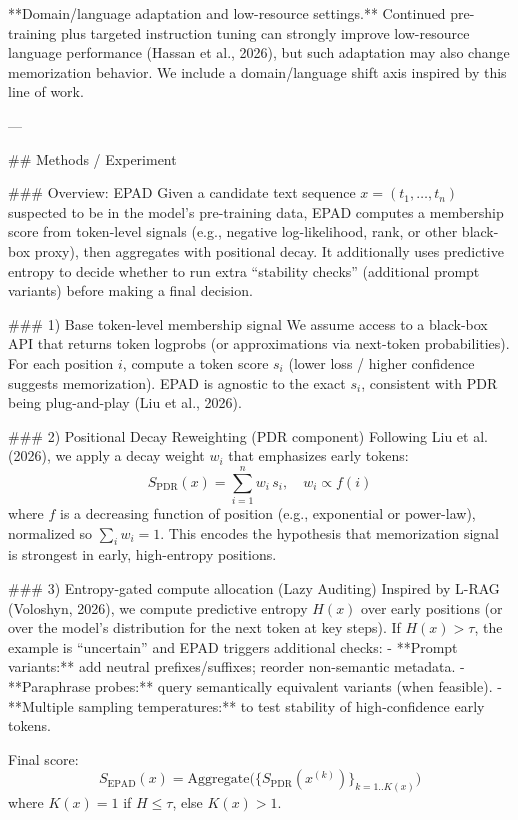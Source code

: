 **Domain/language adaptation and low-resource settings.** Continued pre-training plus targeted instruction tuning can strongly improve low-resource language performance (Hassan et al., 2026), but such adaptation may also change memorization behavior. We include a domain/language shift axis inspired by this line of work.

---

## Methods / Experiment  

### Overview: EPAD  
Given a candidate text sequence \(x = (t_1,\dots,t_n)\) suspected to be in the model’s pre-training data, EPAD computes a membership score from token-level signals (e.g., negative log-likelihood, rank, or other black-box proxy), then aggregates with positional decay. It additionally uses predictive entropy to decide whether to run extra “stability checks” (additional prompt variants) before making a final decision.

### 1) Base token-level membership signal  
We assume access to a black-box API that returns token logprobs (or approximations via next-token probabilities). For each position \(i\), compute a token score \(s_i\) (lower loss / higher confidence suggests memorization). EPAD is agnostic to the exact \(s_i\), consistent with PDR being plug-and-play (Liu et al., 2026).

### 2) Positional Decay Reweighting (PDR component)  
Following Liu et al. (2026), we apply a decay weight \(w_i\) that emphasizes early tokens:
\[
S_{\text{PDR}}(x) = \sum_{i=1}^{n} w_i \, s_i,\quad w_i \propto f(i)
\]
where \(f\) is a decreasing function of position (e.g., exponential or power-law), normalized so \(\sum_i w_i = 1\). This encodes the hypothesis that memorization signal is strongest in early, high-entropy positions.

### 3) Entropy-gated compute allocation (Lazy Auditing)  
Inspired by L-RAG (Voloshyn, 2026), we compute predictive entropy \(H(x)\) over early positions (or over the model’s distribution for the next token at key steps). If \(H(x) > \tau\), the example is “uncertain” and EPAD triggers additional checks:
- **Prompt variants:** add neutral prefixes/suffixes; reorder non-semantic metadata.
- **Paraphrase probes:** query semantically equivalent variants (when feasible).
- **Multiple sampling temperatures:** to test stability of high-confidence early tokens.

Final score:
\[
S_{\text{EPAD}}(x)= \text{Aggregate}\big(\{S_{\text{PDR}}(x^{(k)})\}_{k=1..K(x)}\big)
\]
where \(K(x)=1\) if \(H\le\tau\), else \(K(x)>1\).

